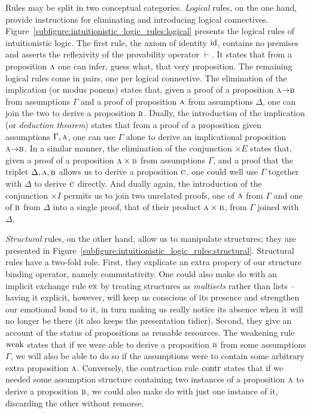 Rules may be split in two conceptual categories.
\textit{Logical} rules, on the one hand, provide instructions for eliminating and introducing logical connectives.
Figure~\ref{subfigure:intuitionistic_logic_rules:logical} presents the logical rules of intuitionistic logic.
The first rule, the axiom of identity $\mathrm{id}$, contains no premises and asserts the reflexivity of the provability operator $\vdash$. 
It states that from a proposition $\smallprop{A}$ one can infer, guess what, that very proposition.
The remaining logical rules come in pairs, one per logical connective.
The elimination of the implication (or modus ponens) states that, given a proof of a proposition $\smallprop A \ii \prop B$ from assumptions $\Gamma$ and a proof of proposition $\smallprop{A}$ from assumptions $\Delta$, one can join the two to derive a proposition $\smallprop{B}$.
Dually, the introduction of the implication (or \textit{deduction theorem}) states that from a proof of a proposition  given assumptions $\Gamma, \smallprop{A}$, one can use $\Gamma$ alone to derive an implicational proposition $\smallprop A \ii \smallprop B$.
In a similar manner, the elimination of the conjunction $\times E $ states that, given a proof of a proposition $\smallprop A \times \smallprop B$ from assumptions $\Gamma$, and a proof that the triplet $\Delta, \smallprop A, \smallprop B$ allows us to derive a proposition $\smallprop C$, one could well use $\Gamma$ together with $\Delta$ to derive $\prop C$ directly.
And dually again, the introduction of the conjunction $\times I$ permits us to join two unrelated proofs, one of $\smallprop A$ from $\Gamma$ and one of $\smallprop B$ from $\Delta$ into a single proof, that of their product $\smallprop A \times \smallprop B$, from $\Gamma$ joined with $\Delta$.

\textit{Structural} rules, on the other hand, allow us to manipulate structures; they are presented in Figure~\ref{subfigure:intuitionistic_logic_rules:structural}.
Structural rules have a two-fold role.
First, they explicate an extra propery of our structure binding operator, namely commutativity.
One could also make do with an implicit exchange rule $\mathrm{ex}{}$ by treating structures as \textit{multisets} rather than lists -- having it explicit, however, will keep us conscious of its presence and strengthen our emotional bond to it, in turn making us really notice its absence when it will no longer be there (it also keeps the presentation tidier).
Second, they give an account of the status of propositions as reusable resources.
The weakening rule $\mathrm{weak}{}$ states that if we were able to derive a proposition $\smallprop{B}$ from some assumptions $\Gamma$, we will also be able to do so if the assumptions were to contain some arbitrary extra proposition $\smallprop{A}$.
Conversely, the contraction rule $\mathrm{contr}{}$ states that if we needed some assumption structure containing two instances of a proposition $\smallprop{A}$ to derive a proposition $\smallprop{B}$, we could also make do with just one instance of it, discarding the other without remorse.

